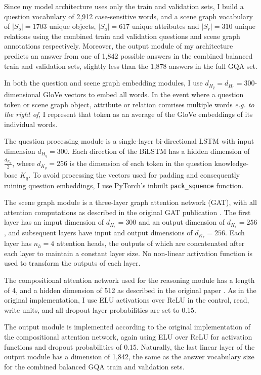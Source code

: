 Since my model architecture uses only the train and validation sets, I build a question vocabulary of 2,912 case-sensitive words, and a scene graph vocabulary of \(|S_o| = 1703\) unique objects, \(|S_a| = 617\) unique attributes and \(|S_r| = 310\) unique relations using the combined train and validation questions and scene graph annotations respectively. Moreover, the output module of my architecture predicts an answer from one of 1,842 possible answers in the combined balanced train and validation sets, slightly less than the 1,878 answers in the full GQA set.

In both the question and scene graph embedding modules, I use \(d_{H_q} = d_{H_r} = 300\)-dimensional GloVe vectors \cite{pennington2014glove} to embed all words. In the event where a question token or scene graph object, attribute or relation comrises multiple words \textit{e.g. to the right of}, I represent that token as an average of the GloVe embeddings of its individual words.

The question processing module is a single-layer bi-directional LSTM \cite{hochreiter1997long} with input dimension \(d_{H_q} = 300\). Each direction of the BiLSTM has a hidden dimension of \(\frac{d_{K_q}}{2}\), where \(d_{K_q} = 256\) is the dimension of each token in the question knowledge-base \(K_q\). To avoid processing the vectors used for padding and consequently ruining question embeddings, I use PyTorch's inbuilt \texttt{pack\_squence} function. \cite{paszke2019pytorch}

The scene graph module is a three-layer graph attention network (GAT), with all attention computations as described in the original GAT publication \cite{velivckovic2017graph}. The first layer has an imput dimension of \(d_{H_r} = 300\) and an output dimension of \(d_{K_r} = 256\), and subsequent layers have input and output dimensions of \(d_{K_r} = 256\). Each layer has \(n_h = 4\) attention heads, the outputs of which are concatenated after each layer to maintain a constant layer size. No non-linear activation function is used to transform the outputs of each layer.

The compositional attention network used for the reasoning module has a length of 4, and a hidden dimension of 512 as described in the original paper \cite{hudson2018compositional}. As in the original implementation, I use ELU activations over ReLU in the control, read, write units, and all dropout layer probabilities are set to 0.15.

The output module is implemented according to the original implementation of the compositional attention network, again using ELU over ReLU for activation functions and dropout probabilities of 0.15. Naturally, the last linear layer of the output module has a dimension of 1,842, the same as the answer vocabulary size for the combined balanced GQA train and validation sets.

